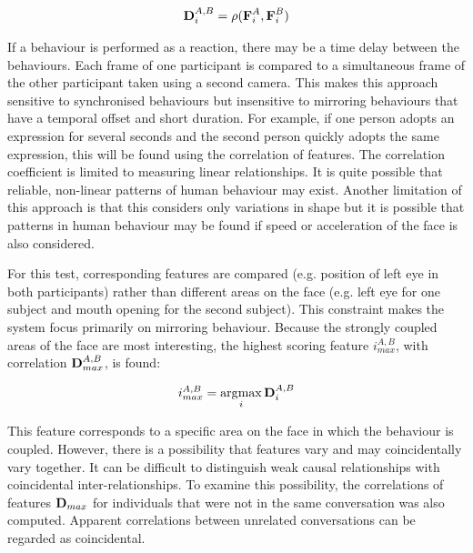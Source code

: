 \begin{gather}
\textbf{D}^{A,B}_i = \rho(\textbf{F}^A_i, \textbf{F}^B_i)
\end{gather}

If a behaviour is performed as a reaction, there may be a time delay between the behaviours. Each frame of one participant is compared to a simultaneous frame of the other participant taken using a second camera. This makes this approach sensitive to synchronised behaviours but insensitive to mirroring behaviours that have a temporal offset and short duration. For example, if one person adopts an expression for several seconds and the second person quickly adopts the same expression, this will be found using the correlation of features. The correlation coefficient is limited to measuring linear relationships. It is quite possible that reliable, non-linear patterns of human behaviour may exist. Another limitation of this approach is that this considers only variations in shape but it is possible that patterns in human behaviour may be found if speed or acceleration of the face is also considered.

For this test, corresponding features are compared (e.g. position of left eye in both participants) rather than different areas on the face (e.g. left eye for one subject and mouth opening for the second subject). This constraint makes the system focus primarily on mirroring behaviour. Because the strongly coupled areas of the face are most interesting, the highest scoring feature $i^{A,B}_{max}$, with correlation $\textbf{D}^{A,B}_{max}$, is found:

\begin{gather}
i^{A,B}_{max} = \operatorname*{\arg\!\max}_{i}{\textbf{D}^{A,B}_i}
\end{gather}

This feature corresponds to a specific area on the face in which the behaviour is coupled. However, there is a possibility that features vary and may coincidentally vary together. It can be difficult to distinguish weak causal relationships with coincidental inter-relationships. To examine this possibility, the correlations of features $\textbf{D}_{max}$ for individuals that were not in the same conversation was also computed. Apparent correlations between unrelated conversations can be regarded as coincidental.

